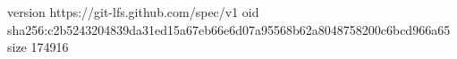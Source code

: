 version https://git-lfs.github.com/spec/v1
oid sha256:c2b5243204839da31ed15a67eb66e6d07a95568b62a8048758200c6bcd966a65
size 174916
